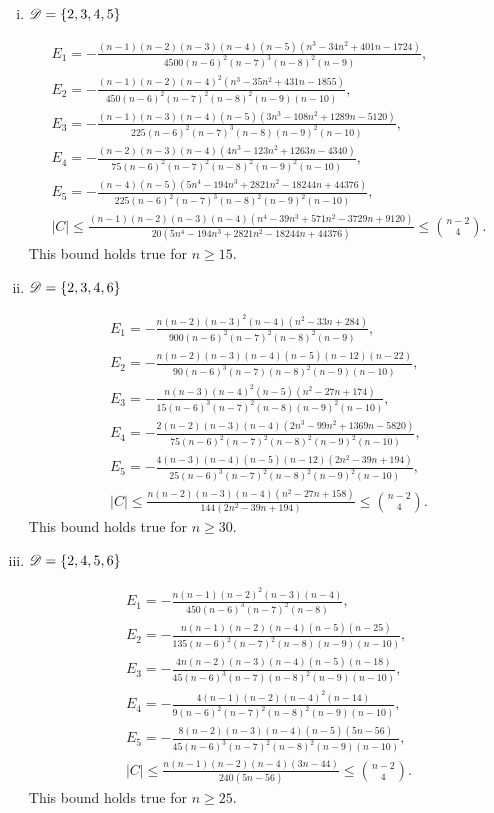 \documentclass{amsart}
\begin{document}
{\begin{enumerate}[(i)]
\item $\mathscr{D}=\{2,3,4,5\}$

\begin{gather*}
E_1=-\frac{(n-1)(n-2)(n-3)(n-4)(n-5)\left(n^3-34n^2+401n-1724\right)}{4500(n-6)^2(n-7)^3(n-8)^2(n-9)}, \\
E_2=-\frac{(n-1)(n-2)(n-4)^2\left(n^3-35n^2+431n-1855\right)}{450(n-6)^2(n-7)^2(n-8)^2(n-9)(n-10)},\\ 
E_3=-\frac{(n-1)(n-3)(n-4)(n-5)\left(3n^3-108n^2+1289n-5120\right)}{225(n-6)^2(n-7)^3(n-8)(n-9)^2(n-10)},\\
E_4=-\frac{(n-2)(n-3)(n-4)\left(4n^3-123n^2+1263n-4340\right)}{75(n-6)^2(n-7)^2(n-8)^2(n-9)^2(n-10)},\\
E_5=-\frac{(n-4)(n-5)\left(5n^4-194n^3+2821n^2-18244n+44376\right)}{225(n-6)^2(n-7)^3(n-8)^2(n-9)^2(n-10)},\\
|C|\le \frac{(n-1)(n-2)(n-3)(n-4)\left(n^4-39n^3+571n^2-3729n+9120\right)}{20\left(5n^4-194n^3+2821n^2-18244n+44376\right)} \leq \binom{n-2}{4}.
\end{gather*}
This bound holds true for $n\ge 15.$

\item $\mathscr{D}=\{2,3,4,6\}$

\begin{gather*}
E_1=-\frac{n(n-2)(n-3)^2(n-4)\left(n^2-33n+284\right)}{900(n-6)^2(n-7)^2(n-8)^2(n-9)}, \\
E_2=-\frac{n(n-2)(n-3)(n-4)(n-5)(n-12)(n-22)}{90(n-6)^3(n-7)(n-8)^2(n-9)(n-10)},\\ 
E_3=-\frac{n(n-3)(n-4)^2(n-5)\left(n^2-27n+174\right)}{15(n-6)^3(n-7)^2(n-8)(n-9)^2(n-10)},\\
E_4=-\frac{2(n-2)(n-3)(n-4)\left(2n^3-99n^2+1369n-5820\right)}{75(n-6)^2(n-7)^2(n-8)^2(n-9)^2(n-10)},\\
E_5=-\frac{4(n-3)(n-4)(n-5)(n-12)\left(2n^2-39n+194\right)}{25(n-6)^3(n-7)^2(n-8)^2(n-9)^2(n-10)},\\
|C|\le \frac{n(n-2)(n-3)(n-4)\left(n^2-27n+158\right)}{144\left(2n^2-39n+194\right)} \leq \binom{n-2}{4}.
\end{gather*}
This bound holds true for $n\ge 30.$

\item $\mathscr{D}=\{2,4,5,6\}$

\begin{gather*}
E_1=-\frac{n(n-1)(n-2)^2(n-3)(n-4)}{450(n-6)^3(n-7)^2(n-8)},\\ E_2=-\frac{n(n-1)(n-2)(n-4)(n-5)(n-25)}{135(n-6)^2(n-7)^2(n-8)(n-9)(n-10)},\\ 
E_3=-\frac{4n(n-2)(n-3)(n-4)(n-5)(n-18)}{45(n-6)^3(n-7)(n-8)^2(n-9)(n-10)},\\
E_4=-\frac{4(n-1)(n-2)(n-4)^2(n-14)}{9(n-6)^2(n-7)^2(n-8)^2(n-9)(n-10)},\\
E_5=-\frac{8(n-2)(n-3)(n-4)(n-5)(5n-56)}{45(n-6)^3(n-7)^2(n-8)^2(n-9)(n-10)},\\
|C|\le \frac{n(n-1)(n-2)(n-4)(3n-44)}{240(5n-56)} \leq \binom{n-2}{4}.
\end{gather*}
This bound holds true for $n\ge 25.$


\end{enumerate}}
\end{document}
